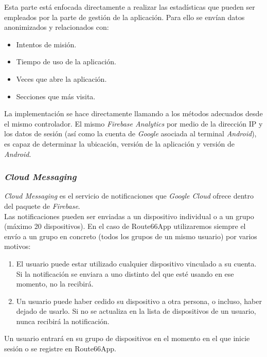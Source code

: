 \documentclass[twoside]{report}
\begin{document}
Esta parte está enfocada directamente a realizar las estadísticas que pueden ser empleados por la parte de gestión de la aplicación. Para ello se envían datos anonimizados y relacionados con:

\begin{itemize}
\item Intentos de misión.
\item Tiempo de uso de la aplicación.
\item Veces que abre la aplicación.
\item Secciones que más visita.
\end{itemize}

La implementación se hace directamente llamando a los métodos adecuados desde el mismo controlador. El mismo \textit{Firebase Analytics} por medio de la dirección IP y los datos de sesión (así como la cuenta de \textit{Google} asociada al terminal \textit{Android}), es capaz de determinar la ubicación, versión de la aplicación y versión de \textit{Android}.

\subsubsection{\textit{Cloud Messaging}}

\textit{Cloud Messaging} es el servicio de notificaciones que \textit{Google Cloud} ofrece dentro del paquete de \textit{Firebase}. \\

Las notificaciones pueden ser enviadas a un dispositivo individual o a un grupo (máximo 20 dispositivos). En el caso de Route66App utilizaremos siempre el envío a un grupo en concreto (todos los grupos de un mismo usuario) por varios motivos:

\begin{enumerate}
\item El usuario puede estar utilizado cualquier dispositivo vinculado a su cuenta. Si la notificación se enviara a uno distinto del que esté usando en ese momento, no la recibirá.

\item Un usuario puede haber cedido su dispositivo a otra persona, o incluso, haber dejado de usarlo. Si no se actualiza en la lista de dispositivos de un usuario, nunca recibirá la notificación.
\end{enumerate}

Un usuario entrará en su grupo de dispositivos en el momento en el que inicie sesión o se registre en Route66App.
\end{document}
